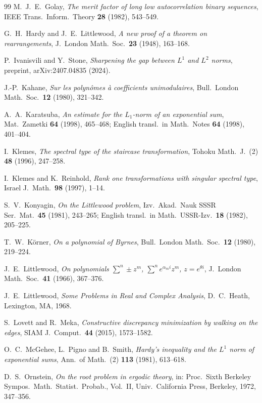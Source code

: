\documentclass[11pt,reqno]{amsart}
\theoremstyle{definition}
\begin{document}
\begin{thebibliography}{99}
 M.~J.~E.~Golay, \emph{The merit factor of long low autocorrelation binary sequences}, IEEE Trans.\ Inform.\ Theory \textbf{28} (1982), 543--549.

 G.~H.~Hardy and J.~E.~Littlewood, \emph{A new proof of a theorem on rearrangements}, J.\ London Math.\ Soc.\ \textbf{23} (1948), 163--168.

 P.~Ivanisvili and Y.~Stone, \emph{Sharpening the gap between $L^1$ and $L^2$ norms}, preprint, arXiv:2407.04835 (2024).

 J.-P.~Kahane, \emph{Sur les polyn\^omes \`a coefficients unimodulaires}, Bull.\ London Math.\ Soc.\ \textbf{12} (1980), 321--342.

 A.~A.~Karatsuba, \emph{An estimate for the $L_1$-norm of an exponential sum}, Mat.\ Zametki \textbf{64} (1998), 465--468; English transl.\ in Math.\ Notes \textbf{64} (1998), 401--404.

 I.~Klemes, \emph{The spectral type of the staircase transformation}, Tohoku Math.\ J.\ (2) \textbf{48} (1996), 247--258.

 I.~Klemes and K.~Reinhold, \emph{Rank one transformations with singular spectral type}, Israel J.\ Math.\ \textbf{98} (1997), 1--14.

 S.~V.~Konyagin, \emph{On the Littlewood problem}, Izv.\ Akad.\ Nauk SSSR Ser.\ Mat.\ \textbf{45} (1981), 243--265; English transl.\ in Math.\ USSR-Izv.\ \textbf{18} (1982), 205--225.

 T.~W.~K\"orner, \emph{On a polynomial of Byrnes}, Bull.\ London Math.\ Soc.\ \textbf{12} (1980), 219--224.

 J.~E.~Littlewood, \emph{On polynomials $\sum^n\pm z^m$, $\sum^ne^{\alpha_mi}z^m$, $z=e^{\theta i}$}, J.\ London Math.\ Soc.\ \textbf{41} (1966), 367--376.

 J.~E.~Littlewood, \emph{Some Problems in Real and Complex Analysis}, D.~C.~Heath, Lexington, MA, 1968.

 S.~Lovett and R.~Meka, \emph{Constructive discrepancy minimization by walking on the edges}, SIAM J.\ Comput.\ \textbf{44} (2015), 1573--1582.

 O.~C.~McGehee, L.~Pigno and B.~Smith, \emph{Hardy's inequality and the $L^1$ norm of exponential sums}, Ann.\ of Math.\ (2) \textbf{113} (1981), 613--618.

 D.~S.~Ornstein, \emph{On the root problem in ergodic theory}, in: Proc.\ Sixth Berkeley Sympos.\ Math.\ Statist.\ Probab., Vol.~II, Univ.\ California Press, Berkeley, 1972, 347--356.


\end{thebibliography}
\end{document}
